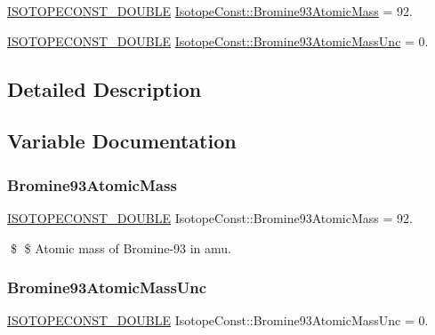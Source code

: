 \begin{DoxyCompactItemize}
\item 
\mbox{\hyperlink{group___isotope_const-_macros_ga8f45a7272ce02c0b4c65c44636ed719a}{I\+S\+O\+T\+O\+P\+E\+C\+O\+N\+S\+T\+\_\+\+D\+O\+U\+B\+LE}} \mbox{\hyperlink{group___isotope_const-_bromine-_br93_ga1a74e706670e1d5b1de8767a823ee88a}{Isotope\+Const\+::\+Bromine93\+Atomic\+Mass}} = 92.
\item 
\mbox{\hyperlink{group___isotope_const-_macros_ga8f45a7272ce02c0b4c65c44636ed719a}{I\+S\+O\+T\+O\+P\+E\+C\+O\+N\+S\+T\+\_\+\+D\+O\+U\+B\+LE}} \mbox{\hyperlink{group___isotope_const-_bromine-_br93_gafae60216350e32b840e9c448d37a8a05}{Isotope\+Const\+::\+Bromine93\+Atomic\+Mass\+Unc}} = 0.
\end{DoxyCompactItemize}


\subsection{Detailed Description}


\subsection{Variable Documentation}
\mbox{\label{group___isotope_const-_bromine-_br93_ga1a74e706670e1d5b1de8767a823ee88a}} 
\subsubsection{\texorpdfstring{Bromine93\+Atomic\+Mass}{Bromine93AtomicMass}}
{\footnotesize\ttfamily \mbox{\hyperlink{group___isotope_const-_macros_ga8f45a7272ce02c0b4c65c44636ed719a}{I\+S\+O\+T\+O\+P\+E\+C\+O\+N\+S\+T\+\_\+\+D\+O\+U\+B\+LE}} Isotope\+Const\+::\+Bromine93\+Atomic\+Mass = 92.}

\$ \$ Atomic mass of Bromine-\/93 in amu. \mbox{\label{group___isotope_const-_bromine-_br93_gafae60216350e32b840e9c448d37a8a05}} 
\subsubsection{\texorpdfstring{Bromine93\+Atomic\+Mass\+Unc}{Bromine93AtomicMassUnc}}
{\footnotesize\ttfamily \mbox{\hyperlink{group___isotope_const-_macros_ga8f45a7272ce02c0b4c65c44636ed719a}{I\+S\+O\+T\+O\+P\+E\+C\+O\+N\+S\+T\+\_\+\+D\+O\+U\+B\+LE}} Isotope\+Const\+::\+Bromine93\+Atomic\+Mass\+Unc = 0.}

